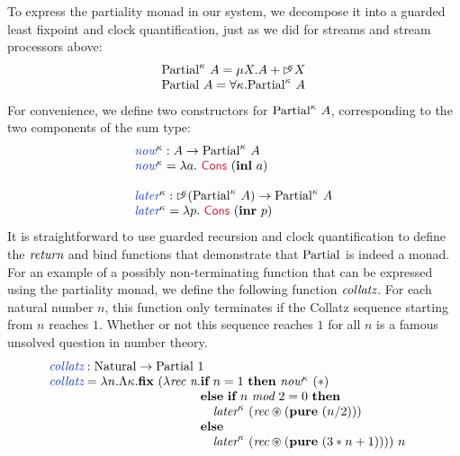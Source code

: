 To express the partiality monad in our system, we decompose it into a
guarded least fixpoint and clock quantification, just as we did for
streams and stream processors above:
\begin{displaymath}
  \begin{array}{l}
    \textrm{Partial}^\kappa~A = \mu X. A + \mathord{\rhd\kern-0.4em^{\kappa}} X \\
    \textrm{Partial}~A = \forall \kappa. \textrm{Partial}^\kappa~A
  \end{array}
\end{displaymath}
For convenience, we define two constructors for
$\textrm{Partial}^\kappa~A$, corresponding to the two components of
the sum type:
\begin{displaymath}
  \begin{array}{l}
    \defn{now}^\kappa : A \to \tyname{Partial}^\kappa~A \\
    \defn{now}^\kappa = \lambda a.~\cons{Cons}~(\kw{inl}~a) \\
    \\
    \defn{later}^\kappa : \delay\kappa (\tyname{Partial}^\kappa~A) \to \tyname{Partial}^\kappa~A \\
    \defn{later}^\kappa = \lambda p.~\cons{Cons}~(\kw{inr}~p)
  \end{array}
\end{displaymath}
It is straightforward to use guarded recursion and clock
quantification to define the $\textit{return}$ and bind functions that
demonstrate that $\textrm{Partial}$ is indeed a monad. For an example
of a possibly non-terminating function that can be expressed using the
partiality monad, we define the following function
$\textit{collatz}$. For each natural number $n$, this function only
terminates if the Collatz sequence starting from $n$ reaches
$1$. Whether or not this sequence reaches $1$ for all $n$ is a famous
unsolved question in number theory.
\begin{displaymath}
  \begin{array}{@{}l}
    \defn{collatz} : \tyname{Natural} \to \tyname{Partial}~1 \\
    \defn{collatz} = \lambda n. \Lambda \kappa. \kw{fix}~(\lambda \ident{rec}~\ident{n}.
    \begin{array}[t]{@{}l}
      \kw{if}~n = 1~\kw{then}~\ident{now}^\kappa~(*) \\
      \kw{else}~\kw{if}~n~\ident{mod}~2 = 0~\kw{then} \\
      \quad \ident{later}^\kappa~(\ident{rec} \circledast (\kw{pure}~(n/2))) \\
      \kw{else} \\
      \quad \ident{later}^\kappa~(\ident{rec} \circledast (\kw{pure}~(3*n + 1))))~n
    \end{array}
  \end{array}
\end{displaymath}

